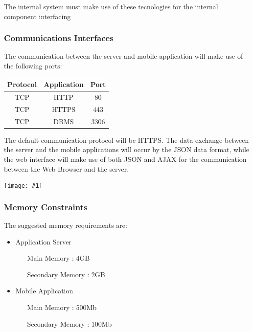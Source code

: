 \documentclass[11pt, a4paper,titlepage]{article}
\newcommand{\image}[1]{
	\begin{center}
		\noindent \texttt{[image: \#1]}
	\end{center}
	}
\begin{document}
The internal system must make use of these tecnologies for the internal component interfacing

\subsubsection{Communications Interfaces}
	The communication between the server and mobile application will make use of the following ports:
	\newline \newline
	\begin{tabular}{c c c}
		\textbf{Protocol} & \textbf{Application} & \textbf{Port} \\
		\hline
		TCP & HTTP & 80 \\
		\hline
		TCP & HTTPS & 443 \\
		\hline
		TCP & DBMS & 3306 \\
		\hline
	\end{tabular}
	\newline \newline
	The default communication protocol will be HTTPS. \newline
	The data exchange between the server and the mobile applications will occur by the JSON data format, while the web interface will make use of both JSON and AJAX for the communication between the Web Browser and the server.
		
	\image{schema_communication_interface.png}
	
\subsubsection{Memory Constraints}
The suggested memory requirements are: \newline
\begin{itemize}
	\item Application Server
	\begin{itemize}
		\item[Main Memory]: 4GB
		\item[Secondary Memory]: 2GB
	\end{itemize}
	\item Mobile Application
	\begin{itemize}
			\item[Main Memory]: 500Mb
			\item[Secondary Memory]: 100Mb
	\end{itemize}
\end{itemize}
\end{document}
